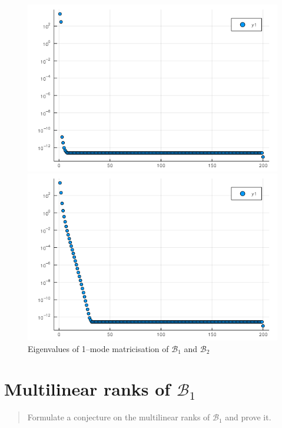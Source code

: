 \documentclass[%
a4paper,
parskip=half,
DIV=calc,
]
{scrartcl}
\begin{document}
%
\begin{figure}[h]
  \begin{minipage}[b]{0.5\linewidth}
    \centering
    \includegraphics[width=\linewidth]{eigvalb1}
  \end{minipage}
  \begin{minipage}[b]{0.5\linewidth}
    \includegraphics[width=\linewidth]{eigvalb2}
  \end{minipage}
  \caption{Eigenvalues of 1--mode matricisation of $\mathcal{B}_1$ and $\mathcal{B}_2$}
  \label{fig:eigvals}
\end{figure}


\section{Multilinear ranks of $\mathcal{B}_1$}
\label{sec:mrb1}
\begin{quotation}
  \noindent
  Formulate a conjecture on the multilinear ranks of $\mathcal{B}_1$
  and prove it.
\end{quotation}
\end{document}
